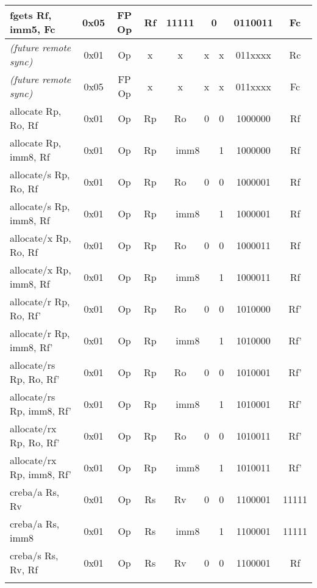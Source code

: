 \documentclass[a4paper,11pt]{article}
\begin{document}
\begin{table}
\begin{center}
{\begin{tabular}{|>{\ttfamily}l||c|c|c|c|c|c|c|c|}
fgets  Rf, imm5, Fc     & 0x05 & FP Op  & Rf & 11111 & \multicolumn{2}{c|}{0} &   0110011 & Fc \\ \cline{6-7}
\hline\hline
\normalfont \emph{(future remote sync)} & 0x01 & Op & x & x & x & x & 011xxxx & Rc \\
\normalfont \emph{(future remote sync)} & 0x05 & FP Op & x & x & x & x & 011xxxx & Fc \\
\hline \hline
allocate Rp, Ro, Rf     & 0x01 & Op     & Rp &                    Ro & 0 & 0 & 1000000 & Rf \\ \cline{5-6}
allocate Rp, imm8, Rf   & 0x01 & Op     & Rp & \multicolumn{2}{c|}{imm8} & 1 & 1000000 & Rf \\ \cline{5-6}
allocate/s Rp, Ro, Rf   & 0x01 & Op     & Rp &                    Ro & 0 & 0 & 1000001 & Rf \\ \cline{5-6}
allocate/s Rp, imm8, Rf & 0x01 & Op     & Rp & \multicolumn{2}{c|}{imm8} & 1 & 1000001 & Rf \\ \cline{5-6}
allocate/x Rp, Ro, Rf   & 0x01 & Op     & Rp &                    Ro & 0 & 0 & 1000011 & Rf \\ \cline{5-6}
allocate/x Rp, imm8, Rf & 0x01 & Op     & Rp & \multicolumn{2}{c|}{imm8} & 1 & 1000011 & Rf \\ \cline{5-6}
allocate/r Rp, Ro, Rf'     & 0x01 & Op     & Rp &                    Ro & 0 & 0 & 1010000 & Rf' \\ \cline{5-6}
allocate/r Rp, imm8, Rf'   & 0x01 & Op     & Rp & \multicolumn{2}{c|}{imm8} & 1 & 1010000 & Rf' \\ \cline{5-6}
allocate/rs Rp, Ro, Rf'   & 0x01 & Op     & Rp &                    Ro & 0 & 0 & 1010001 & Rf' \\ \cline{5-6}
allocate/rs Rp, imm8, Rf' & 0x01 & Op     & Rp & \multicolumn{2}{c|}{imm8} & 1 & 1010001 & Rf' \\ \cline{5-6}
allocate/rx Rp, Ro, Rf'   & 0x01 & Op     & Rp &                    Ro & 0 & 0 & 1010011 & Rf' \\ \cline{5-6}
allocate/rx Rp, imm8, Rf' & 0x01 & Op     & Rp & \multicolumn{2}{c|}{imm8} & 1 & 1010011 & Rf' \\ \cline{5-6}
\hline \hline
creba/a Rs, Rv          & 0x01 & Op     & Rs &                    Rv & 0 & 0 & 1100001 & 11111 \\ \cline{5-6}
creba/a Rs, imm8        & 0x01 & Op     & Rs & \multicolumn{2}{c|}{imm8} & 1 & 1100001 & 11111 \\ \cline{5-6}
creba/s Rs, Rv, Rf      & 0x01 & Op     & Rs &                    Rv & 0 & 0 & 1100001 & Rf \\ \cline{5-6}

\end{tabular}}
\end{center}
\end{table}
\end{document}
